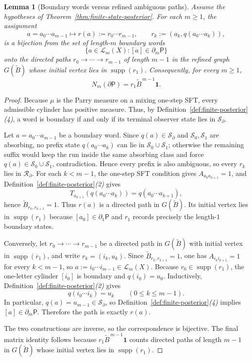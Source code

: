 \documentclass{etds}%
\numberwithin{equation}{section}
\theoremstyle{plain}
\newtheorem{lemma}[theorem]{Lemma}
\theoremstyle{definition}
\theoremstyle{remark}
\begin{document}
\begin{lemma}[Boundary words versus refined ambiguous paths]
\label{lem:boundary-word-refined-path}
Assume the hypotheses of Theorem~\ref{thm:finite-state-posterior}.  For each
$m\ge 1$, the assignment
\[
a=a_0\cdots a_{m-1}
\longmapsto
r(a):=r_0\cdots r_{m-1},
\qquad
r_k:=(a_k,q(a_0\cdots a_k)),
\]
is a bijection from the set of length-$m$ boundary words
\[
\{a\in\mathcal{L}_m(X):[a]\in\partial_m\mathsf{P}\}
\]
onto the directed paths
$r_0\to\cdots\to r_{m-1}$ of length $m-1$ in the refined graph
$G(\widetilde B)$ whose initial vertex lies in $\operatorname{supp}(r_1)$.
Consequently, for every $m\ge 1$,
\[
N_m(\partial\mathsf{P})=r_1\widetilde B^{\,m-1}\mathbf{1}.
\]
\end{lemma}

\begin{proof}
Because $\mu$ is the Parry measure on a mixing one-step SFT, every admissible
cylinder has positive measure.  Thus, by
Definition~\ref{def:finite-posterior}\emph{(4)}, a word is boundary if and only
if its terminal observer state lies in $\mathcal{S}_\partial$.

Let $a=a_0\cdots a_{m-1}$ be a boundary word.  Since
$q(a)\in\mathcal{S}_\partial$ and $\mathcal{S}_0,\mathcal{S}_1$ are absorbing,
no prefix state $q(a_0\cdots a_k)$ can lie in $\mathcal{S}_0\cup\mathcal{S}_1$;
otherwise the remaining suffix would keep the run inside the same absorbing
class and force $q(a)\in\mathcal{S}_0\cup\mathcal{S}_1$, contradiction.  Hence
every prefix is also ambiguous, so every $r_k$ lies in $\mathcal{R}_\partial$.
For each $k<m-1$, the one-step SFT condition gives $A_{a_ka_{k+1}}=1$, and
Definition~\ref{def:finite-posterior}\emph{(2)} gives
\[
T_{a_{k+1}}(q(a_0\cdots a_k))=q(a_0\cdots a_{k+1}),
\]
hence $\widetilde B_{r_k,r_{k+1}}=1$.  Thus $r(a)$ is a directed path in
$G(\widetilde B)$.  Its initial vertex lies in $\operatorname{supp}(r_1)$
because $[a_0]\in\partial_1\mathsf{P}$ and $r_1$ records precisely the
length-$1$ boundary states.

Conversely, let $r_0\to\cdots\to r_{m-1}$ be a directed path in
$G(\widetilde B)$ with initial vertex in $\operatorname{supp}(r_1)$, and write
$r_k=(i_k,u_k)$.  Since $\widetilde B_{r_k,r_{k+1}}=1$, one has
$A_{i_ki_{k+1}}=1$ for every $k<m-1$, so
$a:=i_0\cdots i_{m-1}\in\mathcal{L}_m(X)$.  Because
$r_0\in\operatorname{supp}(r_1)$, the one-letter cylinder $[i_0]$ is boundary
and $q(i_0)=u_0$.  Inductively,
Definition~\ref{def:finite-posterior}\emph{(2)} gives
\[
q(i_0\cdots i_k)=u_k
\qquad(0\le k\le m-1).
\]
In particular, $q(a)=u_{m-1}\in\mathcal{S}_\partial$, so
Definition~\ref{def:finite-posterior}\emph{(4)} implies
$[a]\in\partial_m\mathsf{P}$.  Therefore the path is exactly $r(a)$.

The two constructions are inverse, so the correspondence is bijective.  The
final matrix identity follows because $r_1\widetilde B^{\,m-1}\mathbf{1}$ counts
directed paths of length $m-1$ in $G(\widetilde B)$ whose initial vertex lies
in $\operatorname{supp}(r_1)$.
\end{proof}
\end{document}
